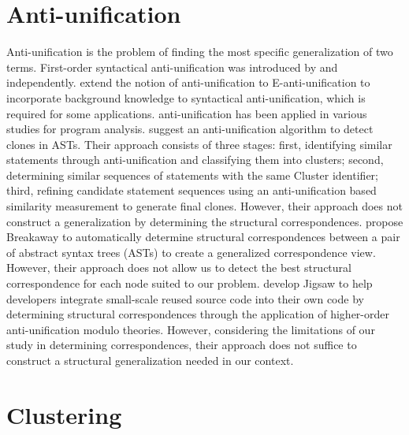 \section{Anti-unification}  \label{ch7-au}
Anti-unification is the problem of finding the most specific generalization of two terms. First-order syntactical anti-unification was introduced by \citet{plotkin1970note} and \citet{reynolds1970transformational} independently. \citet{burghardt1996implementing} extend the notion of anti-unification to E-anti-unification to incorporate background knowledge to syntactical anti-unification, which is required for some applications. anti-unification has been applied in various studies for program analysis. \citet{bulychev2009evaluation} suggest an anti-unification algorithm to detect clones in ASTs. Their approach consists of three stages: first, identifying similar statements through anti-unification and classifying them into clusters; second, determining similar sequences of statements with the same Cluster identifier; third, refining candidate statement sequences using an anti-unification based similarity measurement to generate final clones. However, their approach does not construct a generalization by determining the structural correspondences. \citet{2007:esec_fse:cottrell} propose Breakaway to automatically determine structural correspondences between a pair of abstract syntax trees (ASTs) to create a generalized correspondence view. However, their approach does not allow us to detect the best structural correspondence for each node suited to our problem. \citet{2008:fse:cottrell} develop Jigsaw to help developers integrate small-scale reused source code into their own code by determining structural correspondences through the application of higher-order anti-unification modulo theories. However, considering the limitations of our study in determining correspondences, their approach does not suffice to construct a structural generalization needed in our context.


\section{Clustering}  \label{ch7-clustering}

